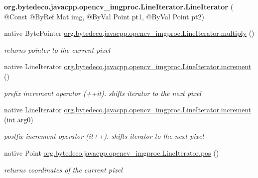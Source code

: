 \begin{DoxyCompactItemize}
\mbox{\label{group__imgproc_ga17055ede04995a70651678322cf7bc69}} 
{\bfseries org.\+bytedeco.\+javacpp.\+opencv\+\_\+imgproc.\+Line\+Iterator.\+Line\+Iterator} ( @Const @By\+Ref Mat img, @By\+Val Point pt1, @By\+Val Point pt2)
\item 
\mbox{\label{group__imgproc_ga1a32d4fc28b174d1ae2f436bb13385be}} 
native Byte\+Pointer \hyperlink{group__imgproc_ga1a32d4fc28b174d1ae2f436bb13385be}{org.\+bytedeco.\+javacpp.\+opencv\+\_\+imgproc.\+Line\+Iterator.\+multiply} ()
\begin{DoxyCompactList}\small\item\em returns pointer to the current pixel \end{DoxyCompactList}\item 
\mbox{\label{group__imgproc_gaa0691a9f57bd9d78c104fccda8e2175f}} 
native Line\+Iterator \hyperlink{group__imgproc_gaa0691a9f57bd9d78c104fccda8e2175f}{org.\+bytedeco.\+javacpp.\+opencv\+\_\+imgproc.\+Line\+Iterator.\+increment} ()
\begin{DoxyCompactList}\small\item\em prefix increment operator (++it). shifts iterator to the next pixel \end{DoxyCompactList}\item 
\mbox{\label{group__imgproc_ga63d8d28be11ae7dc5174bed1378b026c}} 
native Line\+Iterator \hyperlink{group__imgproc_ga63d8d28be11ae7dc5174bed1378b026c}{org.\+bytedeco.\+javacpp.\+opencv\+\_\+imgproc.\+Line\+Iterator.\+increment} (int arg0)
\begin{DoxyCompactList}\small\item\em postfix increment operator (it++). shifts iterator to the next pixel \end{DoxyCompactList}\item 
\mbox{\label{group__imgproc_ga2eeb5802ad1e50df4b7d2fee4ec99f19}} 
native Point \hyperlink{group__imgproc_ga2eeb5802ad1e50df4b7d2fee4ec99f19}{org.\+bytedeco.\+javacpp.\+opencv\+\_\+imgproc.\+Line\+Iterator.\+pos} ()
\begin{DoxyCompactList}\small\item\em returns coordinates of the current pixel \end{DoxyCompactList}\item 

\end{DoxyCompactItemize}
